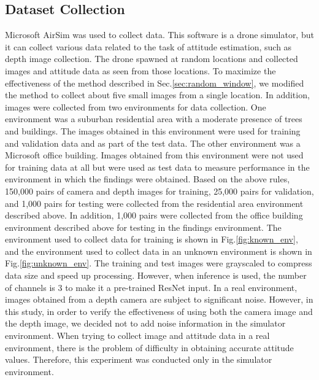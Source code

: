 \subsection{Dataset Collection}\label{sec:dataset}
Microsoft AirSim\cite{airsim_paper} was used to collect data. This software is a drone simulator, but it can collect various data related to the task of attitude estimation, such as depth image collection. The drone spawned at random locations and collected images and attitude data as seen from those locations. To maximize the effectiveness of the method described in Sec.\ref{sec:random_window}, we modified the method to collect about five small images from a single location. In addition, images were collected from two environments for data collection. One environment was a suburban residential area with a moderate presence of trees and buildings. The images obtained in this environment were used for training and validation data and as part of the test data. The other environment was a Microsoft office building. Images obtained from this environment were not used for training data at all but were used as test data to measure performance in the environment in which the findings were obtained. Based on the above rules, 150,000 pairs of camera and depth images for training, 25,000 pairs for validation, and 1,000 pairs for testing were collected from the residential area environment described above. In addition, 1,000 pairs were collected from the office building environment described above for testing in the findings environment. The environment used to collect data for training is shown in Fig.\ref{fig:known_env}, and the environment used to collect data in an unknown environment is shown in Fig.\ref{fig:unknown_env}. The training and test images were grayscaled to compress data size and speed up processing. However, when inference is used, the number of channels is 3 to make it a pre-trained ResNet input. In a real environment, images obtained from a depth camera are subject to significant noise. However, in this study, in order to verify the effectiveness of using both the camera image and the depth image, we decided not to add noise information in the simulator environment. When trying to collect image and attitude data in a real environment, there is the problem of difficulty in obtaining accurate attitude values. Therefore, this experiment was conducted only in the simulator environment.

